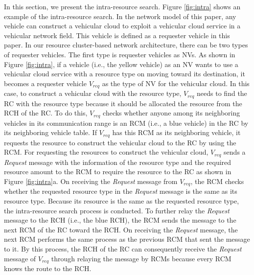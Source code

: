 \documentclass[sensors,article,accept,moreauthors,pdftex]{Definitions/mdpi}
\begin{document}
In this section, we present the intra-resource search.
Figure \ref{fig:intra} shows an example of the intra-resource search.
In the network model of this paper, any vehicle can construct a vehicular cloud to exploit a vehicular cloud service in a vehicular network field.
This vehicle is defined as a requester vehicle in this paper.
In our resource cluster-based network architecture, there can be two types of requester vehicles.
The first type is requester vehicles as NVs.
As shown in Figure \ref{fig:intra}, if a vehicle (i.e., the yellow vehicle) as an NV wants to use a vehicular cloud service with a resource type on moving toward its destination, it becomes a requester vehicle $V_{req}$ as the type of NV for the vehicular cloud. 
In this case, to construct a vehicular cloud with the resource type, $V_{req}$ needs to find the RC with the resource type because it should be allocated the resource from the RCH of the RC.
To do this, $V_{req}$ checks whether anyone among its neighboring vehicles in its communication range is an RCM (i.e., a blue vehicle) in the RC by its neighboring vehicle table.
If $V_{req}$ has this RCM as its neighboring vehicle, it requests the resource to construct the vehicular cloud to the RC by using the RCM.
For requesting the resources to construct the vehicular cloud, $V_{req}$ sends a \textit{Request} message with the information of the resource type and the required resource amount to the RCM to require the resource to the RC as shown in Figure  \ref{fig:intra}a.
On receiving the \textit{Request} message from $V_{req}$, the RCM checks whether the requested resource type in the \textit{Request} message is the same as its resource type.
Because its resource is the same as the requested resource type, the intra-resource search process is conducted. 
To further relay the \textit{Request} message to the RCH (i.e., the blue RCH), the RCM sends the message to the next RCM of the RC toward the RCH. 
On receiving the \textit{Request} message, the next RCM performs the same process as the previous RCM that sent the message to it.
By this process, the RCH of the RC can consequently receive the \textit{Request} message of $V_{req}$ through relaying the message by RCMs because every RCM knows the route to the RCH.
\end{document}
